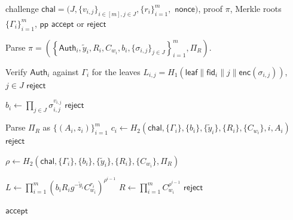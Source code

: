 \documentclass[lettersize,journal]{IEEEtran}
\newcommand{\Verify}{\mathsf{Verify}}
\begin{document}
\begin{algorithm}[t]
\caption{\textbf{$\Verify$}}
\label{alg:verify}
\begin{algorithmic}[1]
\Require challenge $\mathsf{chal}=(J,\{v_{i,j}\}_{i\in[m],j\in J},\{r_i\}_{i=1}^m,$ $\mathsf{nonce})$, proof $\pi$, Merkle roots $\{\Gamma_i\}_{i=1}^m$, $\mathsf{pp}$
\Ensure $\mathsf{accept}$ or $\mathsf{reject}$

\State Parse $\pi=
\left(
\left\{
\mathsf{Auth}_i,\tilde{y}_i,R_i,C_{w_i},b_i,\{\sigma_{i,j}\}_{j\in J}
\right\}_{i=1}^m,\Pi_R
\right).
$

    \State Verify $\mathsf{Auth}_i$ against $\Gamma_i$ for the leaves $L_{i,j}=H_1(\mathsf{leaf}\|\mathsf{fid}_i\|j\|\mathsf{enc}(\sigma_{i,j}))$, $j\in J$
        \State \Return $\mathsf{reject}$
    \EndIf
\EndFor

    \State $\hat{b}_i \gets \prod_{j\in J} \sigma_{i,j}^{v_{i,j}}$
        \State \Return $\mathsf{reject}$
    \EndIf
\EndFor

\State Parse $\Pi_R$ as $\{(A_i,z_i)\}_{i=1}^m$
    \State $c_i\gets H_2(\mathsf{chal},\{\Gamma_i\},\{b_i\},\{\tilde{y}_i\},\{R_i\},\{C_{w_i}\},i,A_i)$
        \State \Return $\mathsf{reject}$
    \EndIf
\EndFor

\State $\rho \gets H_2(\mathsf{chal},\{\Gamma_i\},\{b_i\},\{\tilde{y}_i\},\{R_i\},\{C_{w_i}\},\Pi_R)$

\State $L\gets \prod_{i=1}^m\left(b_iR_i g^{-\tilde{y}_i}C_{w_i}^{r_i}\right)^{\rho^{i-1}}$
\State $R\gets \prod_{i=1}^m C_{w_i}^{\rho^{i-1}}$
    \State \Return $\mathsf{reject}$
\EndIf

\State \Return $\mathsf{accept}$
\end{algorithmic}
\end{algorithm}
\end{document}
